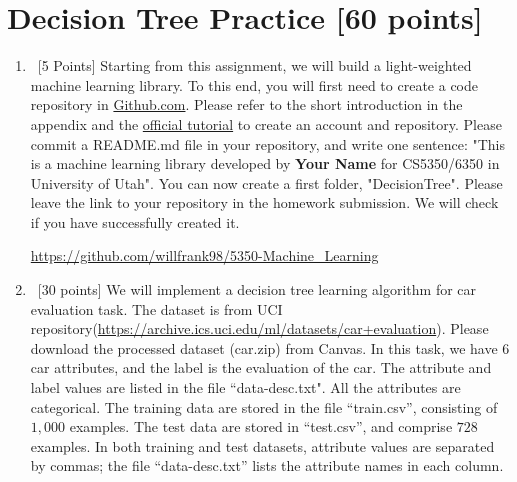 \documentclass[12pt, fullpage,letterpaper]{article}
\begin{document}
\section{Decision Tree Practice [60 points]}
\begin{enumerate}
	\item~[5 Points] Starting from this assignment, we will build a light-weighted machine learning library. 
To this end, you will first need to create a code repository in \href{https://github.com/}{Github.com}. Please refer to the short introduction in the appendix and the \href{https://guides.github.com/activities/hello-world/}{official tutorial} to create an account and repository. Please commit a README.md file in your repository, and write one sentence: "This is a machine learning library developed by \textbf{Your Name} for CS5350/6350 in University of Utah".  You can now create a first folder, "DecisionTree". Please leave the link to your repository in the homework submission. We will check if you have successfully created it. 

\url{https://github.com/willfrank98/5350-Machine_Learning}


\item~[30 points] We will implement a decision tree learning algorithm for car evaluation task. The dataset is from UCI repository(\url{https://archive.ics.uci.edu/ml/datasets/car+evaluation}). Please download the processed dataset (car.zip) from Canvas.  In this task, we have $6$ car attributes, and the label is the evaluation of the car. The attribute and label values are listed in the file ``data-desc.txt". All the attributes are categorical. The training data are stored in the file ``train.csv'', consisting of $1,000$ examples. The test data are stored in ``test.csv'', and comprise $728$ examples. In both training and test datasets, attribute values are separated by commas; the file ``data-desc.txt''  lists the attribute names in each column. 
\\


\end{enumerate}
\end{document}
